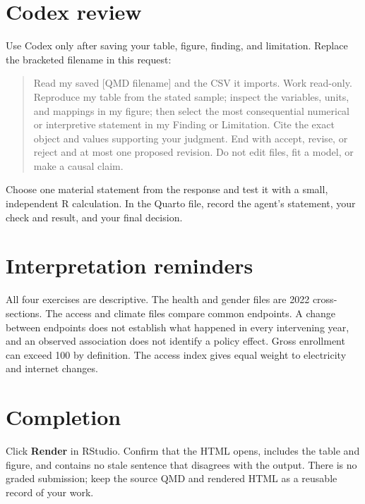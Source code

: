 \documentclass[11pt]{article}
\begin{document}
\section*{Codex review}

Use Codex only after saving your table, figure, finding, and limitation. Replace
the bracketed filename in this request:

\begin{quote}\small
Read my saved [QMD filename] and the CSV it imports. Work read-only. Reproduce
my table from the stated sample; inspect the variables, units, and mappings in
my figure; then select the most consequential numerical or interpretive
statement in my Finding or Limitation. Cite the exact object and values
supporting your judgment. End with accept, revise, or reject and at most one
proposed revision. Do not edit files, fit a model, or make a causal claim.
\end{quote}

Choose one material statement from the response and test it with a small,
independent R calculation. In the Quarto file, record the agent's statement,
your check and result, and your final decision.

\section*{Interpretation reminders}

All four exercises are descriptive. The health and gender files are 2022
cross-sections. The access and climate files compare common endpoints. A
change between endpoints does not establish what happened in every
intervening year, and an observed association does not identify a policy
effect. Gross enrollment can exceed 100 by definition. The access index gives
equal weight to electricity and internet changes.

\section*{Completion}

Click \textbf{Render} in RStudio. Confirm that the HTML opens, includes the
table and figure, and contains no stale sentence that disagrees with the
output. There is no graded submission; keep the source QMD and rendered HTML as
a reusable record of your work.
\end{document}
